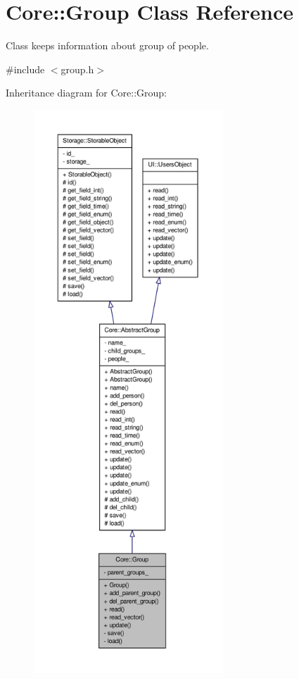 \hypertarget{classCore_1_1Group}{
\section{Core::Group Class Reference}
\label{d2/d30/classCore_1_1Group}
}


Class keeps information about group of people.  




{\ttfamily \#include $<$group.h$>$}



Inheritance diagram for Core::Group:
\nopagebreak
\begin{figure}[H]
\begin{center}
\leavevmode
\includegraphics[height=600pt]{d6/d15/classCore_1_1Group__inherit__graph}
\end{center}
\end{figure}


